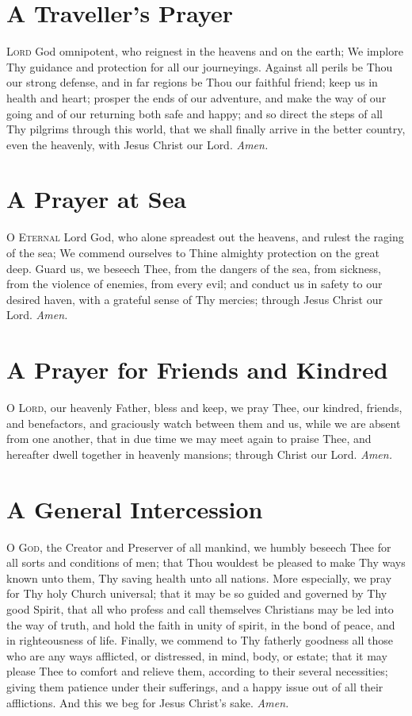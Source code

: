\section*{A Traveller's Prayer}  

\lettrine{L}{ord} God omnipotent, who reignest in the heavens and on the earth; We implore Thy guidance and protection for all our journeyings.
Against all perils be Thou our strong defense, and in far regions be Thou our faithful friend; keep us in health and heart; prosper the ends of our adventure, and make the way of our going and of our returning both safe and happy; and so direct the steps of all Thy pilgrims through this world, that we shall finally arrive in the better country, even the heavenly, with Jesus Christ our Lord.
\textit{Amen.}

\section*{A Prayer at Sea}

\lettrine{O}{ Eternal} Lord God, who alone spreadest out the heavens, and rulest the raging of the sea; We commend ourselves to Thine almighty protection on the great deep.
Guard us, we beseech Thee, from the dangers of the sea, from sickness, from the violence of enemies, from every evil; and conduct us in safety to our desired haven, with a grateful sense of Thy mercies; through Jesus Christ our Lord.
\textit{Amen.}

\section*{A Prayer for Friends and Kindred}

 \lettrine{O}{ Lord,} our heavenly Father, bless and keep, we pray Thee, our kindred, friends, and benefactors, and graciously watch between them and us, while we are absent from one another, that in due time we may meet again to praise Thee, and hereafter dwell together in heavenly mansions; through Christ our Lord.
\textit{Amen.}

\section*{A General Intercession}

\lettrine{O}{ God,} the Creator and Preserver of all mankind, we humbly beseech Thee for all sorts and conditions of men; that Thou wouldest be pleased to make Thy ways known unto them, Thy saving health unto all nations.
More especially, we pray for Thy holy Church universal; that it may be so guided and governed by Thy good Spirit, that all who profess and call themselves Christians may be led into the way of truth, and hold the faith in unity of spirit, in the bond of peace, and in righteousness of life.
Finally, we commend to Thy fatherly goodness all those who are any ways afflicted, or distressed, in mind, body, or estate; that it may please Thee to comfort and relieve them, according to their several necessities; giving them patience under their sufferings, and a happy issue out of all their afflictions.
And this we beg for Jesus Christ's sake.
\textit{Amen.} 

